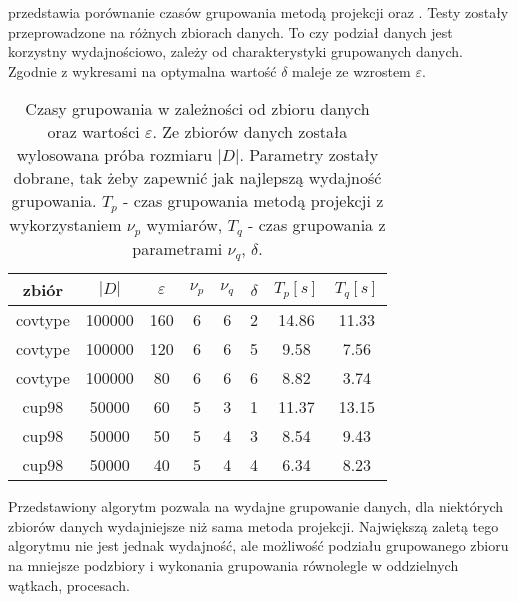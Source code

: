  przedstawia porównanie czasów grupowania metodą projekcji oraz . Testy zostały przeprowadzone na różnych zbiorach danych. To czy podział danych jest korzystny wydajnościowo, zależy od charakterystyki grupowanych danych. Zgodnie z wykresami na  optymalna wartość $ \delta $ maleje ze wzrostem $ \varepsilon $.
\begin{table}[H]
	\centering
	\begin{tabular}{| c | c | c | c | c | c | c | c |}
		\hline
		zbiór     & $ |D| $ & $ \varepsilon $ & $ \nu_p $ & $ \nu_q $ & $ \delta $ & $ T_p [s]$ & $ T_q [s]$ \\ \hline
		covtype   & 100000  & 160 & 6 & 6 & 2 & 14.86 & 11.33  \\ \hline
		covtype   & 100000  & 120 & 6 & 6 & 5 & 9.58  & 7.56   \\ \hline
		covtype   & 100000  &  80 & 6 & 6 & 6 & 8.82  & 3.74   \\ \hline
		cup98     &  50000  &  60 & 5 & 3 & 1 & 11.37 & 13.15  \\ \hline
		cup98     &  50000  &  50 & 5 & 4 & 3 & 8.54  & 9.43    \\ \hline
		cup98     &  50000  &  40 & 5 & 4 & 4 & 6.34  & 8.23    \\ \hline
	\end{tabular}
	\caption{Czasy grupowania w zależności od zbioru danych oraz wartości $ \varepsilon $. Ze zbiorów danych została wylosowana próba rozmiaru $ |D| $. Parametry zostały dobrane, tak żeby zapewnić jak najlepszą wydajność grupowania. $ T_p $ - czas grupowania metodą projekcji z wykorzystaniem $ \nu_p $ wymiarów, $ T_q $ - czas grupowania  z parametrami $ \nu_q $, $ \delta $.}\label{table:projection-vs-qscan}
\end{table}
Przedstawiony algorytm pozwala na wydajne grupowanie danych, dla niektórych zbiorów danych wydajniejsze niż sama metoda projekcji. Największą zaletą tego algorytmu nie jest jednak wydajność, ale możliwość podziału grupowanego zbioru na mniejsze podzbiory i wykonania grupowania równolegle w oddzielnych wątkach, procesach.
